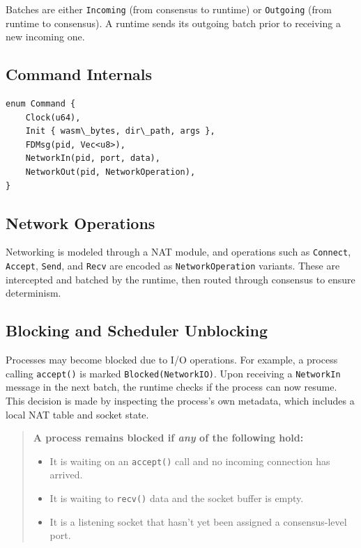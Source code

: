 \documentclass[10pt, 
]{IEEEtran}
\begin{document}
Batches are either \texttt{Incoming} (from consensus to runtime) or \texttt{Outgoing} (from runtime to consensus). A runtime sends its outgoing batch prior to receiving a new incoming one.

\subsection{Command Internals}

\begin{verbatim}
enum Command {
    Clock(u64),
    Init { wasm\_bytes, dir\_path, args },
    FDMsg(pid, Vec<u8>),
    NetworkIn(pid, port, data),
    NetworkOut(pid, NetworkOperation),
}
\end{verbatim}


\subsection{Network Operations}

Networking is modeled through a NAT module, and operations such as \texttt{Connect}, \texttt{Accept}, \texttt{Send}, and \texttt{Recv} are encoded as \texttt{NetworkOperation} variants. These are intercepted and batched by the runtime, then routed through consensus to ensure determinism.

\subsection{Blocking and Scheduler Unblocking}

Processes may become blocked due to I/O operations. For example, a process calling \texttt{accept()} is marked \texttt{Blocked(NetworkIO)}. Upon receiving a \texttt{NetworkIn} message in the next batch, the runtime checks if the process can now resume. This decision is made by inspecting the process’s own metadata, which includes a local NAT table and socket state.

\begin{quote}
\textbf{A process remains blocked if \emph{any} of the following hold:}
\begin{itemize}
\item It is waiting on an \texttt{accept()} call and no incoming connection has arrived.
\item It is waiting to \texttt{recv()} data and the socket buffer is empty.
\item It is a listening socket that hasn't yet been assigned a consensus-level port.
\end{itemize}
\end{quote}
\end{document}
